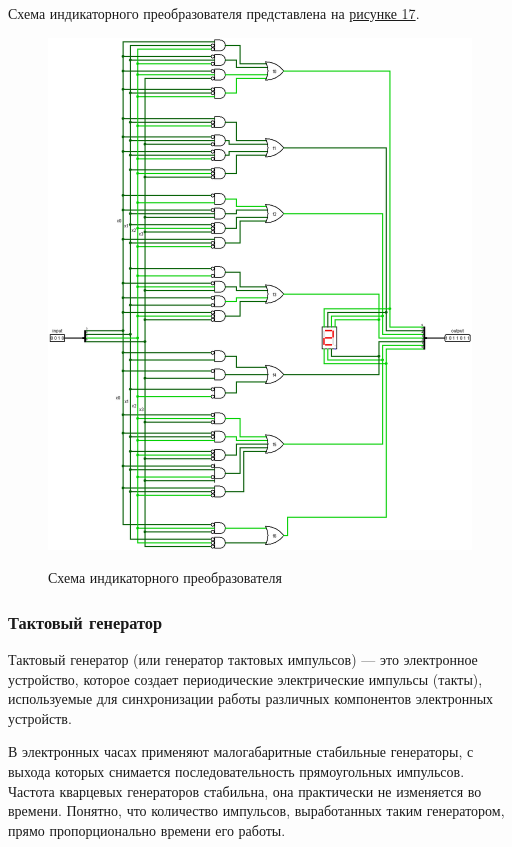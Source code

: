 \documentclass[10pt,a4paper,final]{article} %
\begin{document}
 Схема индикаторного преобразователя представлена на \hyperref[IC_ready]{рисунке 17}.
 
 \begin{figure}[htpb]
 	\centering
 	\includegraphics[scale=0.4]{logisim/img/IC.png}
 	\label{IC_ready} 
 	\caption{Схема индикаторного преобразователя}
 \end{figure}
 
\newpage
\subsubsection{Тактовый генератор}
Тактовый генератор (или генератор тактовых импульсов) — это электронное устройство, которое создает периодические электрические импульсы (такты), используемые для синхронизации работы различных компонентов электронных устройств. 

В электронных часах применяют малогабаритные стабильные генераторы, с выхода которых снимается последовательность прямоугольных импульсов. Частота кварцевых генераторов стабильна, она практически не изменяется во времени. Понятно, что количество импульсов, выработанных таким генератором, прямо пропорционально времени его работы.
\end{document}
